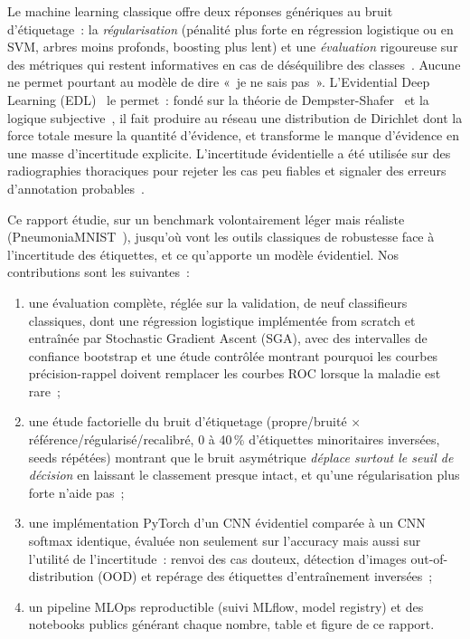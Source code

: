 \documentclass[11pt,a4paper]{article}
\begin{document}
Le machine learning classique offre deux réponses génériques au bruit d'étiquetage~: la \emph{régularisation}
(pénalité plus forte en régression logistique ou en SVM, arbres moins profonds, boosting plus lent) et une
\emph{évaluation} rigoureuse sur des métriques qui restent informatives en cas de déséquilibre des
classes~\cite{saito2015precision}. Aucune ne permet pourtant au modèle de dire «~je ne sais pas~». L'Evidential
Deep Learning (EDL)~\cite{sensoy2018evidential} le permet~: fondé sur la théorie de
Dempster-Shafer~\cite{dempster1967upper,shafer1976mathematical} et la logique subjective~\cite{josang2016subjective}, il
fait produire au réseau une distribution de Dirichlet dont la force totale mesure la quantité d'évidence, et transforme
le manque d'évidence en une masse d'incertitude explicite. L'incertitude évidentielle a été utilisée sur des
radiographies thoraciques pour rejeter les cas peu fiables et signaler des erreurs d'annotation
probables~\cite{ghesu2019quantifying,ghesu2021quantifying}.

Ce rapport étudie, sur un benchmark volontairement léger mais réaliste (PneumoniaMNIST~\cite{yang2023medmnist}),
jusqu'où vont les outils classiques de robustesse face à l'incertitude des étiquettes, et ce qu'apporte un modèle
évidentiel. Nos contributions sont les suivantes~:
\begin{enumerate}
  \item une évaluation complète, réglée sur la validation, de neuf classifieurs classiques, dont une régression
        logistique implémentée from scratch et entraînée par Stochastic Gradient Ascent (SGA), avec des intervalles de
        confiance bootstrap et une étude contrôlée montrant pourquoi les courbes précision-rappel doivent remplacer les
        courbes ROC lorsque la maladie est rare~;
  \item une étude factorielle du bruit d'étiquetage (propre/bruité $\times$ référence/régularisé/recalibré, 0 à
        40\,\% d'étiquettes minoritaires inversées, seeds répétées) montrant que le bruit asymétrique \emph{déplace
        surtout le seuil de décision} en laissant le classement presque intact, et qu'une régularisation plus forte
        n'aide pas~;
  \item une implémentation PyTorch d'un CNN évidentiel comparée à un CNN softmax identique, évaluée non seulement sur
        l'accuracy mais aussi sur l'utilité de l'incertitude~: renvoi des cas douteux, détection d'images out-of-distribution
        (OOD) et repérage des étiquettes d'entraînement inversées~;
  \item un pipeline MLOps reproductible (suivi MLflow, model registry) et des notebooks publics générant chaque
        nombre, table et figure de ce rapport.
\end{enumerate}
\end{document}

